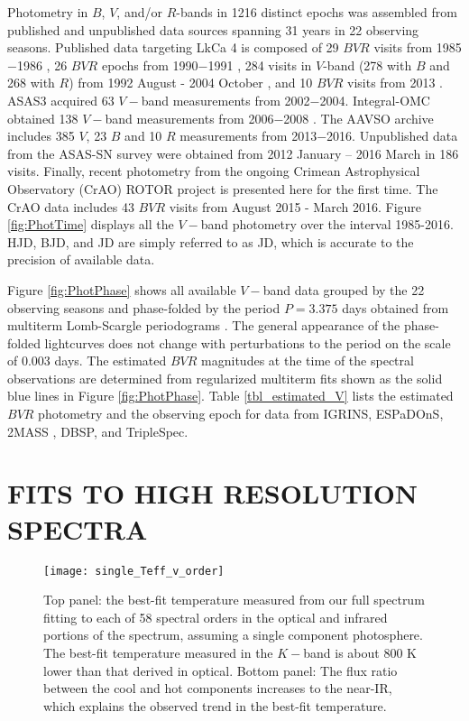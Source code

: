 \documentclass[twocolumn]{emulateapj}%
\newcommand{\name}{LkCa 4 }
\begin{document}
Photometry in $B$, $V$, and/or $R$-bands in 1216 distinct epochs was assembled from published and unpublished data sources spanning 31 years in 22 observing seasons.  Published data targeting \name is composed of 29 $BVR$ visits from 1985$-$1986 \citep{vrba93}, 26 $BVR$ epochs from 1990$-$1991 \citep{bouvier93}, 284 visits in $V$-band (278 with $B$ and 268 with $R$) from 1992 August - 2004 October \citep{grankin08}, and 10 $BVR$ visits from 2013 \citep{donati14}.  ASAS3 \citep{pojmanski04} acquired 63 $V-$band measurements from 2002$-$2004.  Integral-OMC obtained 138 $V-$band measurements from 2006$-$2008 \citep{garzon12}.  The AAVSO archive \citep{kafka16} includes 385 $V$, 23 $B$ and 10 $R$ measurements from 2013$-$2016.  Unpublished data from the ASAS-SN survey \citep{shappee14} were obtained from 2012 January -- 2016 March in 186 visits.  Finally, recent photometry from the ongoing Crimean Astrophysical Observatory (CrAO) ROTOR project \citep{grankin08} is presented here for the first time.  The CrAO data includes 43 $BVR$ visits from August 2015 - March 2016. Figure \ref{fig:PhotTime} displays all the $V-$band photometry over the interval 1985-2016.  HJD, BJD, and JD are simply referred to as JD, which is accurate to the precision of available data.


Figure \ref{fig:PhotPhase} shows all available $V-$band data grouped by the 22 observing seasons and phase-folded by the period $P=3.375$ days obtained from multiterm Lomb-Scargle periodograms \citep{ivezic14}.  The general appearance of the phase-folded lightcurves does not change with perturbations to the period on the scale of 0.003 days.  The estimated $BVR$ magnitudes at the time of the spectral observations are determined from regularized multiterm fits \citep[\emph{i.e.} Fourier series truncated to the first $\sim 4$ components]{vanderplas15a} shown as the solid blue lines in Figure \ref{fig:PhotPhase}.  Table \ref{tbl_estimated_V} lists the estimated $BVR$ photometry and the observing epoch for data from IGRINS, ESPaDOnS, 2MASS \citep{skrutskie06}, DBSP, and TripleSpec.  





\section{FITS TO HIGH RESOLUTION SPECTRA}\label{sec:Starfish}

\begin{figure}
 \centering
 \texttt{[image: single\_Teff\_v\_order]}
 \caption{Top panel:  the best-fit temperature measured from our full spectrum fitting to each of 58 spectral orders in the optical and infrared portions of the spectrum,  assuming a single component photosphere.  The best-fit temperature measured in the $K-$band is about 800 K lower than that derived in optical.  Bottom panel:  The flux ratio between the cool and hot components increases to the near-IR, which explains the observed trend in the best-fit temperature.}
 \label{fig:SingleTeffvsOrder}
\end{figure}
\end{document}
